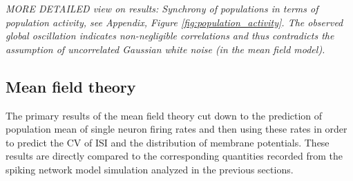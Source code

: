 \emph{MORE DETAILED view on results:
Synchrony of populations in terms of population activity, 
see Appendix, Figure \ref{fig:population_activity}. 
The observed global oscillation indicates non-negligible correlations
and thus contradicts the assumption of uncorrelated Gaussian white noise 
(in the mean field model).}

\subsection{Mean field theory}
The primary results of the mean field theory cut down to the prediction of 
population mean of single neuron firing rates and then using these rates 
in order to predict the CV of ISI and the distribution of membrane potentials. 
These results are directly compared to 
the corresponding quantities recorded from the spiking network 
model simulation analyzed in the previous sections. 

